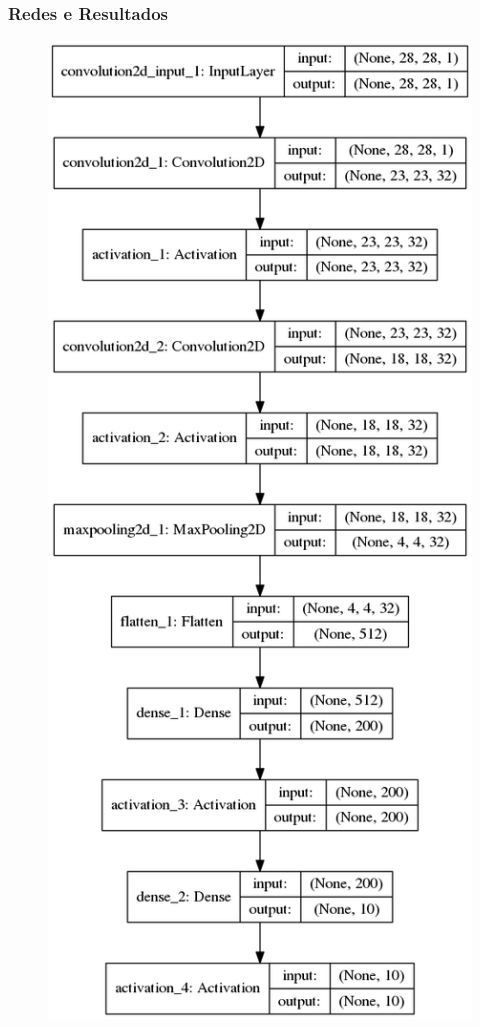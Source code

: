 \documentclass[tikz,10pt]{beamer}
\begin{document}
\begin{frame}
	\frametitle{Redes e Resultados}

    \begin{figure}
	\centering
	\begin{minipage}{.33\textwidth}
		\centering
		\includegraphics[width=.4\linewidth]{images/resultados/default/model}
	\end{minipage}%
	\begin{minipage}{.33\textwidth}
		\centering

\end{minipage}
\end{figure}
\end{frame}
\end{document}
